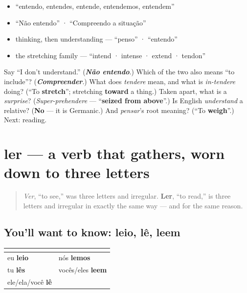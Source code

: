 \begin{itemize}
\raggedright
  \item \textquotedblleft{}entendo, entendes, entende, entendemos, entendem\textquotedblright{}
  \item \textquotedblleft{}Não entendo\textquotedblright{} · \textquotedblleft{}Compreendo a situação\textquotedblright{}
  \item thinking, then understanding — \textquotedblleft{}penso\textquotedblright{} · \textquotedblleft{}entendo\textquotedblright{}
  \item the stretching family — \textquotedblleft{}intend · intense · extend · tendon\textquotedblright{}
\end{itemize}

\begin{tcolorbox}[breakable,colback=teal!4,colframe=teal!35!black,title={Before you move on}]
Say \textquotedblleft{}I don't understand.\textquotedblright{} (\emph{\textbf{Não entendo}}.) Which of the two also means \textquotedblleft{}to include\textquotedblright{}? (\emph{\textbf{Compreender}}.) What does \emph{tendere} mean, and what is \emph{in-tendere} doing? (\textquotedblleft{}To \textbf{stretch}\textquotedblright{}; stretching \textbf{toward} a thing.) Taken apart, what is a \emph{surprise}? (\emph{Super-prehendere} — \textquotedblleft{}\textbf{seized from above}\textquotedblright{}.) Is English \emph{understand} a relative? (\textbf{No} — it is Germanic.) And \emph{pensar}'s root meaning? (\textquotedblleft{}To \textbf{weigh}\textquotedblright{}.) Next: reading.
\end{tcolorbox}
\section[ler]{ler — a verb that gathers, worn down to three letters}

\label{lesson:PT-C19-ler}



\begin{quote}
\emph{Ver}, \textquotedblleft{}to see,\textquotedblright{} was three letters and irregular. \textbf{Ler}, \textquotedblleft{}to read,\textquotedblright{} is three letters and irregular in exactly the same way — and for the same reason.
\end{quote}

\subsection*{You'll want to know: leio, lê, leem}
\noindent
\begin{tabularx}{\linewidth}{@{}>{\raggedright\arraybackslash}X>{\raggedright\arraybackslash}X@{}}
\toprule
\textbf{} & \textbf{} \\
\midrule
eu \textbf{leio} & nós \textbf{lemos} \\
tu \textbf{lês} & vocês/eles \textbf{leem} \\
ele/ela/você \textbf{lê} &  \\
\bottomrule
\end{tabularx}

